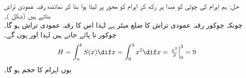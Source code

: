حل:\quad
{}\quad
{}\quad
ہم اہرام کی چوٹی کو مبدا پر رکھ کر اہرام کو  محور پر لیٹا ہوا بنا کر نمائندہ رقبہ عمودی تراش بناتے ہیں (شکل )۔\\
\quad
{}
\quad
چونکہ چوکور رقبہ عمودی تراش کا ضلع  میٹر ہے لہٰذا اس کا رقبہ عمودی تراش  ہو گا۔\\
\quad
{}\quad
چوکور  تا  پائے جاتے ہیں لہٰذا  اور  ہوں گے۔\\
\quad {}
\begin{align*}
H=\int_a^bS(x)\dif x=\int_0^3x^2\dif x=\left.\tfrac{x^3}{3}\right\vert_0^3=9
\end{align*}
یوں اہرام کا حجم  ہو گا۔
